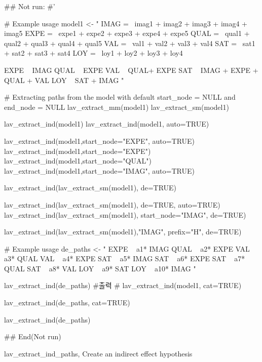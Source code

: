 \documentclass[a4paper]{book}
\begin{document}
\begin{Examples}
\begin{ExampleCode}


\#\# Not run: 
#'

# Example usage
model1 <- "
IMAG =~ imag1 + imag2 + imag3 + imag4 + imag5
EXPE =~ expe1 + expe2 + expe3 + expe4 + expe5
QUAL =~ qual1 + qual2 + qual3 + qual4 + qual5
VAL =~ val1 + val2 + val3 + val4
SAT =~ sat1 + sat2 + sat3 + sat4
LOY =~ loy1 + loy2 + loy3 + loy4

EXPE ~ IMAG
QUAL ~ EXPE
VAL ~  QUAL+ EXPE
SAT ~ IMAG + EXPE + QUAL + VAL
LOY ~ SAT + IMAG
"


# Extracting paths from the model with default start_node = NULL and end_node = NULL
lav_extract_mm(model1) %
lav_extract_sm(model1) %

lav_extract_ind(model1)%
lav_extract_ind(model1, auto=TRUE)%

lav_extract_ind(model1,start_node="EXPE", auto=TRUE)%
lav_extract_ind(model1,start_node="EXPE")%
lav_extract_ind(model1,start_node="QUAL")%
lav_extract_ind(model1,start_node="IMAG", auto=TRUE)%

lav_extract_ind(lav_extract_sm(model1), de=TRUE) %

lav_extract_ind(lav_extract_sm(model1), de=TRUE, auto=TRUE)%
lav_extract_ind(lav_extract_sm(model1), start_node="IMAG", de=TRUE) %

lav_extract_ind(lav_extract_sm(model1),"IMAG", prefix="H", de=TRUE) %

# Example usage
de_paths <- "
EXPE  ~ a1* IMAG
QUAL  ~ a2* EXPE
VAL  ~ a3* QUAL
VAL  ~ a4* EXPE
SAT  ~ a5* IMAG
SAT  ~ a6* EXPE
SAT  ~ a7* QUAL
SAT  ~ a8* VAL
LOY  ~ a9* SAT
LOY  ~ a10* IMAG
"

lav_extract_ind(de_paths)
#출력
#  lav_extract_ind(model1, cat=TRUE)

lav_extract_ind(de_paths, cat=TRUE)

lav_extract_ind(de_paths)%

## End(Not run)

\end{ExampleCode}
\end{Examples}
%
\begin{Description}
lav\_extract\_ind\_paths, Create an indirect effect hypothesis
\end{Description}
\end{document}
